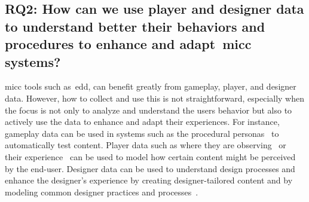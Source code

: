 




\subsection[Research Question 2]{RQ2: How can we use player and designer data to understand better their behaviors and procedures to enhance and adapt~\acrlong{micc} systems?}


\acrlong{micc} tools such as~\acrshort{edd}, can benefit greatly from gameplay, player, and designer data. However, how to collect and use this is not straightforward, especially when the focus is not only to analyze and understand the users behavior but also to actively use the data to enhance and adapt their experiences. For instance, gameplay data can be used in systems such as the procedural personas~\cite{Holmgard2019-proceduralPersonas} to automatically test content. Player data such as where they are observing~\cite{Makantasis2019-pixel2Affect} or their experience~\cite{Yannakakis2011-experiencedrivenPCG} can be used to model how certain content might be perceived by the end-user. Designer data can be used to understand design processes and enhance the designer's experience by creating designer-tailored content and by modeling common designer practices and processes~\cite{Liapis2013-designerModel}.


